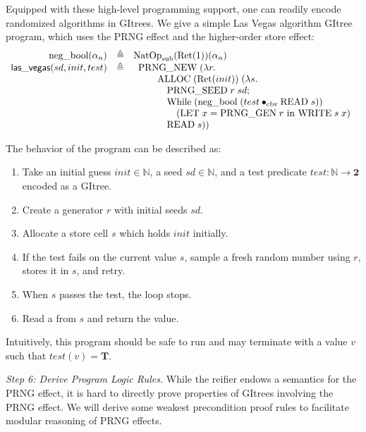 \documentclass{article}
\theoremstyle{definition}
\theoremstyle{plain}
\theoremstyle{remark}
\newcommand{\gRet}{\mathrm{Ret}}
\newcommand{\cbvap}{\bullet_{\text{cbv}}}
\newcommand{\gnatop}[1]{\mathrm{NatOp}_{#1}}
\newcommand{\gwhile}{\mathrm{While}}
\begin{document}
Equipped with these high-level programming support, one can readily encode randomized algorithms in GItrees.
We give a simple Las Vegas algorithm GItree program, which uses the PRNG effect and the higher-order store effect:
\[
\begin{array}{rcl}
\mathrm{neg\_bool}(\alpha_n) & \eqdef & \gnatop{\mathrm{sub}}(\gRet(1))(\alpha_n)\\
\syn{las\_vegas}(sd, init, test)
  & \eqdef &
    \begin{array}[t]{l}
      \mathrm{PRNG\_NEW}\;(\lambda r. \\
      \qquad \mathrm{ALLOC}\;(\gRet(init))\;(\lambda s. \\
      \qquad\quad \mathrm{PRNG\_SEED}\;r\;sd; \\
      \qquad\quad \gwhile\;(\mathrm{neg\_bool}\;(test \cbvap \mathrm{READ}\;s)) \\
      \qquad\qquad (\mathrm{LET}\;x = \mathrm{PRNG\_GEN}\;r\ \mathrm{in}\ \mathrm{WRITE}\;s\;x) \\
      \qquad\quad \mathrm{READ}\;s))
    \end{array}
\end{array}
\]

The behavior of the program can be described as:
\begin{enumerate}
  \item Take an initial guess \(init \in \mathbb{N}\), a seed \(sd \in \mathbb{N}\), and a test predicate \(test : \mathbb{N} \to \mathbf{2}\) encoded as a GItree.
  \item Create a generator \(r\) with initial seeds \(sd\).
  \item Allocate a store cell \(s\) which holds \(init\) initially.
  \item If the test fails on the current value \(s\), sample a fresh random number using \(r\), stores it in \(s\), and retry.
  \item When \(s\) passes the test, the loop stops.
  \item Read a from \(s\) and return the value.
\end{enumerate}
Intuitively, this program should be safe to run and may terminate with a value \(v\) such that \(test(v) = \mathbf{T}\).


\emph{Step 6: Derive Program Logic Rules.} While the reifier endows a semantics for the PRNG effect, it is hard to directly prove properties of GItrees involving the PRNG effect. We will derive some weakest precondition proof rules to facilitate modular reasoning of PRNG effects.\par
\end{document}
